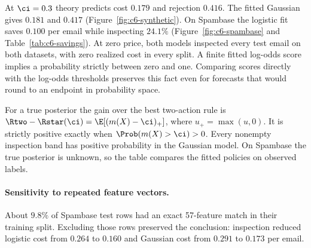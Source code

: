 At $\ci=0.3$ theory predicts cost $0.179$ and rejection $0.416$. The fitted Gaussian
gives $0.181$ and $0.417$ (Figure~\ref{fig:c6-synthetic}). On Spambase the logistic fit
saves $0.100$ per email while inspecting $24.1\%$ (Figure~\ref{fig:c6-spambase} and Table~\ref{tab:c6-savings}).
At zero price, both models inspected every test email on both datasets, with zero realized
cost in every split. A finite fitted log-odds score implies a probability strictly between
zero and one. Comparing scores directly with the log-odds thresholds preserves this fact
even for forecasts that would round to an endpoint in probability space.

For a true posterior the gain over the best two-action rule is
$\Rtwo-\Rstar(\ci)=\E[(m(X)-\ci)_+]$, where $u_+=\max(u,0)$.
It is strictly positive exactly when $\Prob(m(X)>\ci)>0$. Every nonempty inspection
band has positive probability in the Gaussian model. On Spambase the true posterior is unknown,
so the table compares the fitted policies on observed labels.

\paragraph{Sensitivity to repeated feature vectors.}
About $9.8\%$ of Spambase test rows had an exact 57-feature match in their training split.
Excluding those rows preserved the conclusion: inspection reduced logistic cost from
$0.264$ to $0.160$ and Gaussian cost from $0.291$ to $0.173$ per email.
